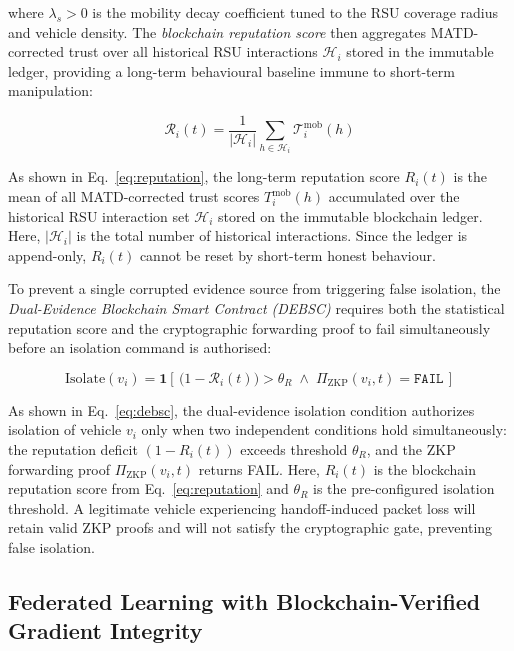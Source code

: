 \documentclass[12pt, a4paper]{report}
\begin{document}
\noindent where $\lambda_s > 0$ is the mobility decay coefficient tuned
to the RSU coverage radius and vehicle density. The \emph{blockchain reputation
score} then aggregates MATD-corrected trust over all historical RSU interactions
$\mathcal{H}_i$ stored in the immutable ledger, providing a long-term behavioural
baseline immune to short-term manipulation:

\begin{equation}
\label{eq:reputation}
\mathcal{R}_i(t) = \frac{1}{|\mathcal{H}_i|}
\sum_{h \in \mathcal{H}_i} \mathcal{T}_i^{\text{mob}}(h)
\end{equation}

As shown in Eq.~\eqref{eq:reputation}, the long-term reputation score $R_i(t)$ is the mean of all MATD-corrected trust scores $T_i^{\text{mob}}(h)$ accumulated over the historical RSU interaction set $\mathcal{H}_i$ stored on the immutable blockchain ledger. Here, $|\mathcal{H}_i|$ is the total number of historical interactions. Since the ledger is append-only, $R_i(t)$ cannot be reset by short-term honest behaviour.

To prevent a single corrupted evidence source from triggering false isolation,
the \emph{Dual-Evidence Blockchain Smart Contract (DEBSC)} requires both the
statistical reputation score and the cryptographic forwarding proof to fail
simultaneously before an isolation command is authorised:

\begin{equation}
\label{eq:debsc}
\mathrm{Isolate}(v_i) = \mathbf{1}\!\left[\,
\bigl(1 - \mathcal{R}_i(t)\bigr) > \theta_R \;\wedge\;
\Pi_{\mathrm{ZKP}}(v_i, t) = \texttt{FAIL}
\,\right]
\end{equation}

As shown in Eq.~\eqref{eq:debsc}, the dual-evidence isolation condition authorizes isolation of vehicle $v_i$ only when two independent conditions hold simultaneously: the reputation deficit $(1 - R_i(t))$ exceeds threshold $\theta_R$, and the ZKP forwarding proof $\Pi_{\text{ZKP}}(v_i, t)$ returns FAIL. Here, $R_i(t)$ is the blockchain reputation score from Eq.~\eqref{eq:reputation} and $\theta_R$ is the pre-configured isolation threshold. A legitimate vehicle experiencing handoff-induced packet loss will retain valid ZKP proofs and will not satisfy the cryptographic gate, preventing false isolation.

\subsection{Federated Learning with Blockchain-Verified Gradient Integrity}
\end{document}
